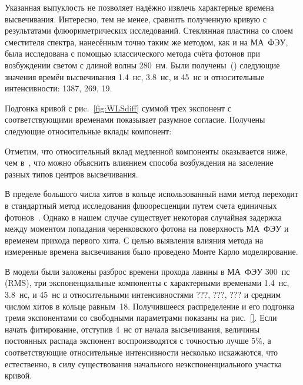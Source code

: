 Указанная выпуклость не позволяет надёжно извлечь характерные времена высвечивания. Интересно, тем не менее, сравнить полученную кривую с результатами флюориметрических исследований. Стеклянная пластина со слоем сместителя спектра, нанесённым точно таким же методом, как и на МА~ФЭУ, была исследована с помощью классического метода счёта фотонов при возбуждении светом с длиной волны 280~нм. Были получены~(\cite{DUERR}) следующие значения времён высвечивания 1.4~нс, 3.8~нс, и 45~нс и относительные интенсивности: 1387, 269, 19.



Подгонка кривой с риc.~\ref{fig:WLSdiff} суммой трех экспонент с соответствующими временами показывает разумное согласие. Получены следующие относительные вклады компонент: 

Отметим, что относительный вклад медленной компоненты оказывается ниже, чем в~\cite{DUERR}, что можно объяснить влиянием способа возбуждения на заселение разных типов центров высвечивания.

В пределе большого числа хитов в кольце использованный нами метод переходит в стандартный метод исследования флюоресценции путем счета единичных фотонов~\cite{SPC}. Однако в нашем случае существует некоторая случайная задержка между моментом попадания черенковского фотона на поверхность МА~ФЭУ и временем прихода первого хита. С целью выявления влияния метода на измеренные времена высвечивания было проведено Монте Карло моделирование.

В модели были заложены разброс времени прохода лавины в МА~ФЭУ 300~пс (RMS), три экспоненциальные компоненты с характерными временами 1.4~нс, 3.8~нс, и 45~нс и относительными интенсивностями ???, ???, ??? и средним числом хитов в кольце равным~18. Получившееся распределение и его подгонка тремя экспонентами со свободными параметрами показаны на рис.~\ref{}. Если начать фитирование, отступив 4~нс от начала высвечивания, величины постоянных распада экспонент воспроизводятся с точностью лучше 5\%, а соответствующие относительные интенсивности несколько искажаются, что естественно, в силу существования начального неэкспоненциального участка кривой.

